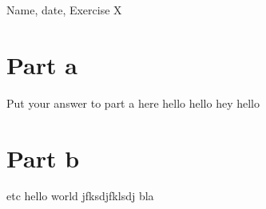 \documentclass{article}
\begin{document}
Name, date, Exercise X

\section*{Part a}

Put your answer to part a here hello hello hey hello 

\section*{Part b}

etc hello world jfksdjfklsdj bla
\end{document}
